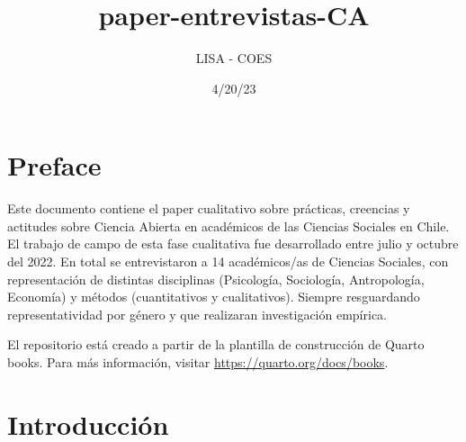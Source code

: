 \documentclass[
  letterpaper,
  DIV=11,
  numbers=noendperiod]{scrreprt}
\title{paper-entrevistas-CA}
\author{LISA - COES}
\date{4/20/23}
\renewcommand*\contentsname{Table of contents}
\newcommand\contentsname{Table of contents}
\begin{document}
\maketitle
\ifdefined\Shaded\renewenvironment{Shaded}{\begin{tcolorbox}[breakable, borderline west={3pt}{0pt}{shadecolor}, interior hidden, boxrule=0pt, sharp corners, enhanced, frame hidden]}{\end{tcolorbox}}\fi

\renewcommand*\contentsname{Table of contents}
{
\hypersetup{linkcolor=}
\setcounter{tocdepth}{2}
\tableofcontents
}

\hypertarget{preface}{%
\chapter*{Preface}\label{preface}}


Este documento contiene el paper cualitativo sobre prácticas, creencias
y actitudes sobre Ciencia Abierta en académicos de las Ciencias Sociales
en Chile. El trabajo de campo de esta fase cualitativa fue desarrollado
entre julio y octubre del 2022. En total se entrevistaron a 14
académicos/as de Ciencias Sociales, con representación de distintas
disciplinas (Psicología, Sociología, Antropología, Economía) y métodos
(cuantitativos y cualitativos). Siempre resguardando representatividad
por género y que realizaran investigación empírica.

El repositorio está creado a partir de la plantilla de construcción de
Quarto books. Para más información, visitar
\url{https://quarto.org/docs/books}.


\hypertarget{introducciuxf3n}{%
\chapter{Introducción}\label{introducciuxf3n}}
\end{document}
